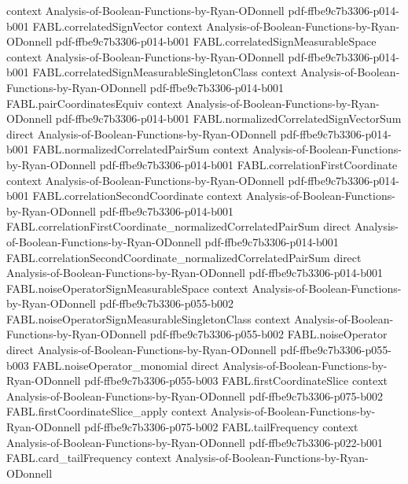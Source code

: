 \begin{theorem}
  {context}
  {Analysis-of-Boolean-Functions-by-Ryan-ODonnell}
  {pdf-ffbe9c7b3306-p014-b001}
\proofstep
  {FABL.correlatedSignVector}
  {context}
  {Analysis-of-Boolean-Functions-by-Ryan-ODonnell}
  {pdf-ffbe9c7b3306-p014-b001}
\proofstep
  {FABL.correlatedSignMeasurableSpace}
  {context}
  {Analysis-of-Boolean-Functions-by-Ryan-ODonnell}
  {pdf-ffbe9c7b3306-p014-b001}
\proofstep
  {FABL.correlatedSignMeasurableSingletonClass}
  {context}
  {Analysis-of-Boolean-Functions-by-Ryan-ODonnell}
  {pdf-ffbe9c7b3306-p014-b001}
\proofstep
  {FABL.pairCoordinatesEquiv}
  {context}
  {Analysis-of-Boolean-Functions-by-Ryan-ODonnell}
  {pdf-ffbe9c7b3306-p014-b001}
\proofstep
  {FABL.normalizedCorrelatedSignVectorSum}
  {direct}
  {Analysis-of-Boolean-Functions-by-Ryan-ODonnell}
  {pdf-ffbe9c7b3306-p014-b001}
\proofstep
  {FABL.normalizedCorrelatedPairSum}
  {context}
  {Analysis-of-Boolean-Functions-by-Ryan-ODonnell}
  {pdf-ffbe9c7b3306-p014-b001}
\proofstep
  {FABL.correlationFirstCoordinate}
  {context}
  {Analysis-of-Boolean-Functions-by-Ryan-ODonnell}
  {pdf-ffbe9c7b3306-p014-b001}
\proofstep
  {FABL.correlationSecondCoordinate}
  {context}
  {Analysis-of-Boolean-Functions-by-Ryan-ODonnell}
  {pdf-ffbe9c7b3306-p014-b001}
\proofstep
  {FABL.correlationFirstCoordinate_normalizedCorrelatedPairSum}
  {direct}
  {Analysis-of-Boolean-Functions-by-Ryan-ODonnell}
  {pdf-ffbe9c7b3306-p014-b001}
\proofstep
  {FABL.correlationSecondCoordinate_normalizedCorrelatedPairSum}
  {direct}
  {Analysis-of-Boolean-Functions-by-Ryan-ODonnell}
  {pdf-ffbe9c7b3306-p014-b001}
\proofstep
  {FABL.noiseOperatorSignMeasurableSpace}
  {context}
  {Analysis-of-Boolean-Functions-by-Ryan-ODonnell}
  {pdf-ffbe9c7b3306-p055-b002}
\proofstep
  {FABL.noiseOperatorSignMeasurableSingletonClass}
  {context}
  {Analysis-of-Boolean-Functions-by-Ryan-ODonnell}
  {pdf-ffbe9c7b3306-p055-b002}
\proofstep
  {FABL.noiseOperator}
  {direct}
  {Analysis-of-Boolean-Functions-by-Ryan-ODonnell}
  {pdf-ffbe9c7b3306-p055-b003}
\proofstep
  {FABL.noiseOperator_monomial}
  {direct}
  {Analysis-of-Boolean-Functions-by-Ryan-ODonnell}
  {pdf-ffbe9c7b3306-p055-b003}
\proofstep
  {FABL.firstCoordinateSlice}
  {context}
  {Analysis-of-Boolean-Functions-by-Ryan-ODonnell}
  {pdf-ffbe9c7b3306-p075-b002}
\proofstep
  {FABL.firstCoordinateSlice_apply}
  {context}
  {Analysis-of-Boolean-Functions-by-Ryan-ODonnell}
  {pdf-ffbe9c7b3306-p075-b002}
\proofstep
  {FABL.tailFrequency}
  {context}
  {Analysis-of-Boolean-Functions-by-Ryan-ODonnell}
  {pdf-ffbe9c7b3306-p022-b001}
\proofstep
  {FABL.card_tailFrequency}
  {context}
  {Analysis-of-Boolean-Functions-by-Ryan-ODonnell}

\end{theorem}

